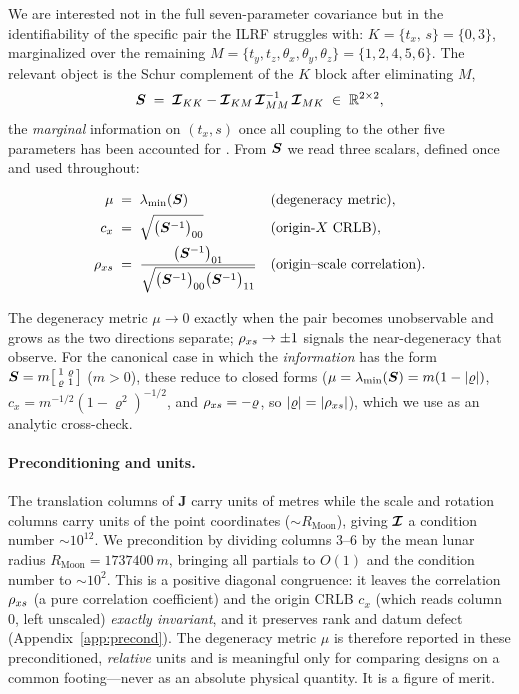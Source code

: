 We are interested not in the full seven-parameter covariance but in the
identifiability of the specific pair the ILRF struggles with:
$K=\{t_x,\,s\}=\{0,3\}$, marginalized over the remaining
$M=\{t_y,t_z,\theta_x,\theta_y,\theta_z\}=\{1,2,4,5,6\}$. The relevant object is
the Schur complement of the $K$ block after eliminating $M$,
\begin{equation}
  \bm{S} \;=\; \bm{\mathcal{I}}_{KK} - \bm{\mathcal{I}}_{KM}\,\bm{\mathcal{I}}_{MM}^{-1}\,\bm{\mathcal{I}}_{MK}
  \;\in\;\mathbb{R}^{2\times2},
  \label{eq:schur}
\end{equation}
the \emph{marginal} information on $(t_x,s)$ once all coupling to the other five
parameters has been accounted for \citep{zhang2005schur,boyd2004convex}. From
$\bm{S}$ we read three scalars, defined once and used throughout:
\begin{definition}
\label{def:metrics}
\begin{align}
  \mu &\;=\; \lambda_{\min}(\bm{S})
     && \text{(degeneracy metric)}, \label{eq:metric}\\
  c_x &\;=\; \sqrt{\bigl(\bm{S}^{-1}\bigr)_{00}}
     && \text{(origin-$X$ CRLB)}, \label{eq:crlb}\\
  \rho_{x s} &\;=\; \frac{\bigl(\bm{S}^{-1}\bigr)_{01}}
                    {\sqrt{\bigl(\bm{S}^{-1}\bigr)_{00}\bigl(\bm{S}^{-1}\bigr)_{11}}}
     && \text{(origin--scale correlation)}. \label{eq:corr}
\end{align}
\end{definition}
The degeneracy metric $\mu\to0$ exactly when the pair becomes unobservable and
grows as the two directions separate; $\rho_{x s}\to\pm1$ signals the near-degeneracy
that \citet{sosnica2025ilrf} observe. For the canonical case in which the
\emph{information} has the form
$\bm{S}=m\bigl[\begin{smallmatrix}1&\varrho\\\varrho&1\end{smallmatrix}\bigr]$
($m>0$), these reduce to closed forms ($\mu=\lambda_{\min}(\bm{S})=m(1-|\varrho|)$,
$c_x=m^{-1/2}(1-\varrho^2)^{-1/2}$, and $\rho_{x s}=-\varrho$, so $|\varrho|=|\rho_{x s}|$),
which we use as an analytic cross-check.

\paragraph{Preconditioning and units.}
The translation columns of $\bm{J}$ carry units of metres while the scale and
rotation columns carry units of the point coordinates ($\sim\!R_{\mathrm{Moon}}$),
giving $\bm{\mathcal{I}}$ a condition number $\sim\!10^{12}$. We precondition by dividing
columns $3$--$6$ by the mean lunar radius $R_{\mathrm{Moon}}=\SI{1737400}{m}$,
bringing all partials to $O(1)$ and the condition number to $\sim\!10^2$. This is a
positive diagonal congruence: it leaves the correlation $\rho_{x s}$ (a pure
correlation coefficient) and the origin CRLB $c_x$ (which reads column $0$, left
unscaled) \emph{exactly invariant}, and it preserves rank and datum defect
(Appendix~\ref{app:precond}). The degeneracy metric $\mu$ is therefore reported in
these preconditioned, \emph{relative} units and is meaningful only for comparing
designs on a common footing---never as an absolute physical quantity. It is a
\Modelled{} figure of merit.
